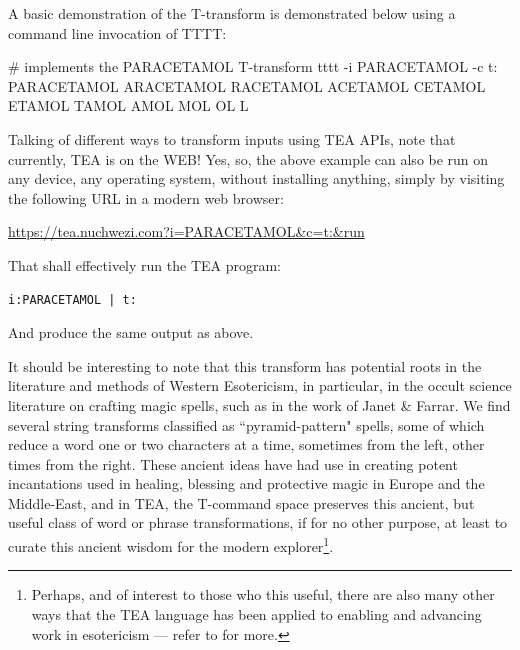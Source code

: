 \documentclass[a4paper, 18pt]{book} %
\begin{document}
{{{\vspace{2em}

A basic demonstration of the T-transform is demonstrated below using a command line invocation of TTTT:

\vspace{2em}

     \begin{tcbverbatim}[title=T: EXAMPLE 1: Triangular Reduction Transform on the Command-line]
# implements the PARACETAMOL T-transform
tttt -i PARACETAMOL -c t:
PARACETAMOL
ARACETAMOL
RACETAMOL
ACETAMOL
CETAMOL
ETAMOL
TAMOL
AMOL
MOL
OL
L
  \end{tcbverbatim}


\vspace{2em}


Talking of different ways to transform inputs using TEA APIs, note that currently, TEA is on the WEB! Yes, so, the above example can also be run on any device, any operating system, without installing anything, simply by visiting the following URL in a modern web browser:

\vspace{2em}

\url{https://tea.nuchwezi.com?i=PARACETAMOL&c=t:&run}

\vspace{2em}

That shall effectively run the TEA program:

\vspace{2em}

  \begin{tcolorbox}[teaterminalstyle, title=T: EXAMPLE 2: Basic T-reduction program, breakable]
  \begin{lstlisting}[language=TEA,breaklines=true,]
i:PARACETAMOL | t:
   \end{lstlisting}
  \end{tcolorbox}

\vspace{1em}


And produce the same output as above.

\vspace{2em}


It should be interesting to note that this transform has potential roots in the literature and methods of Western Esotericism, in particular, in the occult science literature on crafting magic spells, such as in the work of Janet \& Farrar\cite{farrar1990spells}. We find several string transforms classified as ``pyramid-pattern" spells, some of which reduce a word one or two characters at a time, sometimes from the left, other times from the right. These ancient ideas have had use in creating potent incantations used in healing, blessing and protective magic in Europe and the Middle-East\cite{farrar1990spells}, and in TEA, the T-command space preserves this ancient, but useful class of word or phrase transformations, if for no other purpose, at least to curate this ancient wisdom for the modern explorer\footnote{Perhaps, and of interest to those who this useful, there are also many other ways that the TEA language has been applied to enabling and advancing work in esotericism --- refer to \cite{lutalo_2025_grimlumtauto} for more.}.

}}}
\end{document}
